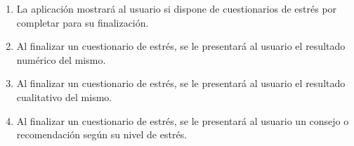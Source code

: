 \begin{enumerate}[series=req-usuario,label=\textbf{\texttt{RU-\arabic*}}]
\begin{enumerate}[series=req-funcionales,label=\textbf{\texttt{RF-\arabic*}}]
                \item \label{req:funcionales:estres_cuestionario_pendientes} La aplicación mostrará al usuario si dispone de cuestionarios de estrés por completar para su finalización.
                \item \label{req:funcionales:estres_cuestionario_numero} Al finalizar un cuestionario de estrés, se le presentará al usuario el resultado numérico del mismo.
                \item \label{req:funcionales:estres_cuestionario_categoria} Al finalizar un cuestionario de estrés, se le presentará al usuario el resultado cualitativo del mismo.
                \item \label{req:funcionales:estres_cuestionario_consejo} Al finalizar un cuestionario de estrés, se le presentará al usuario un consejo o recomendación según su nivel de estrés.
            \end{enumerate}
        \end{enumerate}
